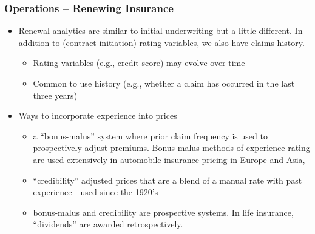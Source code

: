 \documentclass[serif,10pt]{beamer}
\begin{document}
\begin{frame}
\frametitle{Operations -- Renewing Insurance}
  \begin{itemize}
\item Renewal analytics are similar to initial underwriting but a little different. In addition to (contract initiation) rating variables, we also have claims history.
      \begin{itemize}
\item Rating variables (e.g., credit score) may evolve over time
\item Common to use history (e.g., whether a claim has occurred in the last three years)
  \end{itemize}
  \item Ways to incorporate experience into prices
    \begin{itemize}
\item a ``bonus-malus'' system where prior claim frequency is used to prospectively adjust premiums. Bonus-malus methods of experience rating are used extensively in automobile insurance pricing in Europe and Asia,
\item ``credibility'' adjusted prices that are a blend of a manual rate with past experience - used since the 1920's
\item bonus-malus and credibility are prospective systems. In life insurance, ``dividends'' are awarded retrospectively.
    \end{itemize}
\end{itemize}
\end{frame}
\end{document}
